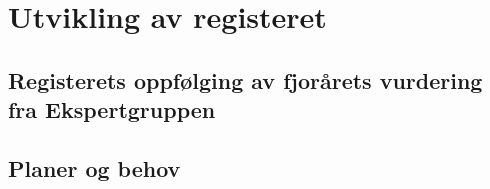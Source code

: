 \documentclass{article}
\begin{document}
    
    
    \section{Utvikling av registeret}
    
    \subsection{Registerets oppfølging av fjorårets vurdering fra Ekspertgruppen}
    
    
    \subsection{Planer og behov}
    
    
    \newpage
    
    \printbibliography[heading={bibnumbered}, title={Litteratur}]
\end{document}
